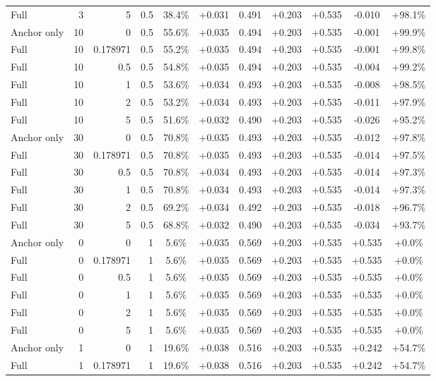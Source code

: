\begin{table}[htbp]
\begin{tabular}{lrrrccccccc}
Full & 3 & 5 & 0.5 & 38.4\% & +0.031 & 0.491 & +0.203 & +0.535 & -0.010 & +98.1\% \\
Anchor only & 10 & 0 & 0.5 & 55.6\% & +0.035 & 0.494 & +0.203 & +0.535 & -0.001 & +99.9\% \\
Full & 10 & 0.178971 & 0.5 & 55.2\% & +0.035 & 0.494 & +0.203 & +0.535 & -0.001 & +99.8\% \\
Full & 10 & 0.5 & 0.5 & 54.8\% & +0.035 & 0.494 & +0.203 & +0.535 & -0.004 & +99.2\% \\
Full & 10 & 1 & 0.5 & 53.6\% & +0.034 & 0.493 & +0.203 & +0.535 & -0.008 & +98.5\% \\
Full & 10 & 2 & 0.5 & 53.2\% & +0.034 & 0.493 & +0.203 & +0.535 & -0.011 & +97.9\% \\
Full & 10 & 5 & 0.5 & 51.6\% & +0.032 & 0.490 & +0.203 & +0.535 & -0.026 & +95.2\% \\
Anchor only & 30 & 0 & 0.5 & 70.8\% & +0.035 & 0.493 & +0.203 & +0.535 & -0.012 & +97.8\% \\
Full & 30 & 0.178971 & 0.5 & 70.8\% & +0.035 & 0.493 & +0.203 & +0.535 & -0.014 & +97.5\% \\
Full & 30 & 0.5 & 0.5 & 70.8\% & +0.034 & 0.493 & +0.203 & +0.535 & -0.014 & +97.3\% \\
Full & 30 & 1 & 0.5 & 70.8\% & +0.034 & 0.493 & +0.203 & +0.535 & -0.014 & +97.3\% \\
Full & 30 & 2 & 0.5 & 69.2\% & +0.034 & 0.492 & +0.203 & +0.535 & -0.018 & +96.7\% \\
Full & 30 & 5 & 0.5 & 68.8\% & +0.032 & 0.490 & +0.203 & +0.535 & -0.034 & +93.7\% \\
Anchor only & 0 & 0 & 1 & 5.6\% & +0.035 & 0.569 & +0.203 & +0.535 & +0.535 & +0.0\% \\
Full & 0 & 0.178971 & 1 & 5.6\% & +0.035 & 0.569 & +0.203 & +0.535 & +0.535 & +0.0\% \\
Full & 0 & 0.5 & 1 & 5.6\% & +0.035 & 0.569 & +0.203 & +0.535 & +0.535 & +0.0\% \\
Full & 0 & 1 & 1 & 5.6\% & +0.035 & 0.569 & +0.203 & +0.535 & +0.535 & +0.0\% \\
Full & 0 & 2 & 1 & 5.6\% & +0.035 & 0.569 & +0.203 & +0.535 & +0.535 & +0.0\% \\
Full & 0 & 5 & 1 & 5.6\% & +0.035 & 0.569 & +0.203 & +0.535 & +0.535 & +0.0\% \\
Anchor only & 1 & 0 & 1 & 19.6\% & +0.038 & 0.516 & +0.203 & +0.535 & +0.242 & +54.7\% \\
Full & 1 & 0.178971 & 1 & 19.6\% & +0.038 & 0.516 & +0.203 & +0.535 & +0.242 & +54.7\% \\

\end{tabular}
\end{table}
